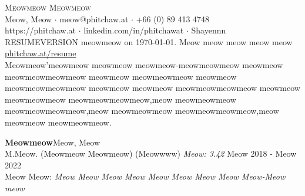 \vspace*{-40pt}
\vspace*{-10pt}
\begin{center}
	{\Huge \scshape {Meowmeow Meowmeow}}\\
	\faMapMarker \vspace{0.4mm} Meow, Meow $\cdot$ \faEnvelope \vspace{0.4mm} meow@phitchaw.at $\cdot$ \faPhone \vspace{0.4mm} +66 (0) 89 413 4748 \\
  \faGlobe \vspace{0.4mm} https://phitchaw.at $\cdot$ \faLinkedinSquare \vspace{0.4mm} linkedin.com/in/phitchawat $\cdot$ \faGithub \vspace{0.4mm} Shayennn\\
\vspace{-2mm}
{\tiny{RESUMEVERSION meowmeow on \today. Meow meow meow meow meow \href{https://github.com/Shayennn/resume/releases/latest/download/Phitchawat_Lukkanathiti_Resume_with_transcript.pdf}{phitchaw.at/resume}}}\\
\vspace{2mm}
	Meowmeow'meowmeow meowmeow meowmeow-meowmeowmeow meowmeow meowmeowmeowmeow meowmeow meowmeowmeow meowmeow meowmeowmeowmeow meowmeow meowmeow meowmeowmeowmeow meowmeow meowmeowmeow meowmeowmeowmeow,meow meowmeowmeow meowmeowmeowmeow,meow meowmeowmeow meowmeowmeowmeow,meow meowmeow meowmeowmeow.
\end{center}
\vspace{2mm}

\textbf{Meowmeow}\hfill Meow, Meow\\
M.Meow. (Meowmeow Meowmeow) (Meowwww) \textit{Meow: 3.42} \hfill Meow 2018 - Meow 2022\\
Meow Meow: \textit{Meow Meow Meow Meow Meow Meow Meow Meow Meow-Meow meow}\\
\vspace{2mm}

\vspace{1mm}

